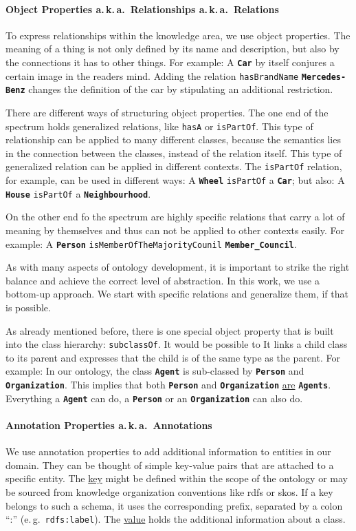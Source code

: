 \documentclass[a4paper, DIV=13, BCOR=0cm]{scrbook}
\newcommand{\eg}{e.\,g.\ }
\newcommand{\aka}{a.\,k.\,a.\ }
\newcommand{\class}[1]{\texttt{\textbf{#1}}}
\newcommand{\relation}[1]{\texttt{#1}}
\newcommand{\prop}[1]{\texttt{#1}}
\begin{document}
\paragraph{Object Properties \aka Relationships \aka Relations}
\label{relations}
To express relationships within the knowledge area, we use object properties. The meaning of a thing is not only defined by its name and description, but also by the connections it has to other things. For example: A \class{Car} by itself conjures a certain image in the readers mind. Adding the relation \relation{hasBrandName} \class{Mercedes-Benz} changes the definition of the car by stipulating an additional restriction.

There are different ways of structuring object properties. The one end of the spectrum holds generalized relations, like \relation{hasA} or \relation{isPartOf}. This type of relationship can be applied to many different classes, because the semantics lies in the connection between the classes, instead of the relation itself. This type of generalized relation can be applied in different contexts. The \relation{isPartOf} relation, for example, can be used in different ways: A \class{Wheel} \relation{isPartOf} a \class{Car}; but also: A \class{House} \relation{isPartOf} a \class{Neighbourhood}.

On the other end fo the spectrum are highly specific relations that carry a lot of meaning by themselves and thus can not be applied to other contexts easily. For example: A \class{Person} \relation{isMemberOfTheMajorityCounil} \class{Member\_Council}.

As with many aspects of ontology development, it is important to strike the right balance and achieve the correct level of abstraction. In this work, we use a bottom-up approach. We start with specific relations and generalize them, if that is possible.

As already mentioned before, there is one special object property that is built into the class hierarchy: \relation{subclassOf}. It would be possible to It links a child class to its parent and expresses that the child is of the same type as the parent. For example: In our ontology, the class \class{Agent} is sub-classed by \class{Person} and \class{Organization}. This implies that both \class{Person} and \class{Organization} \underline{are} \class{Agents}. Everything a \class{Agent} can do, a \class{Person} or an \class{Organization} can also do.

\paragraph{Annotation Properties \aka Annotations}
\label{annotation-properties}
We use annotation properties to add additional information to entities in our domain. They can be thought of simple key-value pairs that are attached to a specific entity. The \underline{key} might be defined within the scope of the ontology or may be sourced from knowledge organization conventions like \gls{rdfs} or \gls{skos}. If a key belongs to such a schema, it uses the corresponding prefix, separated by a colon \enquote{:} (\eg \prop{rdfs:label}). The \underline{value} holds the additional information about a class.
\end{document}
